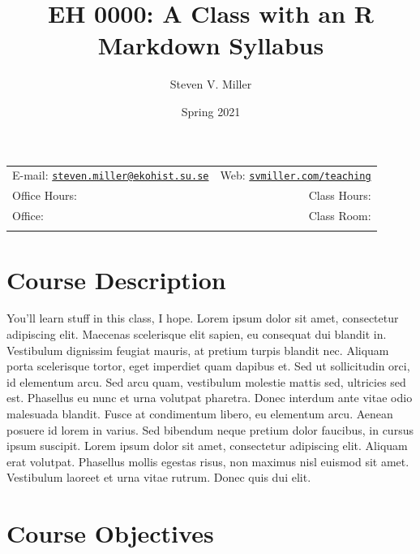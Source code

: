 \documentclass[11pt,]{article}
\title{EH 0000: A Class with an R Markdown Syllabus}
\author{Steven V. Miller}
\date{Spring 2021}
\newcommand{\shrug}[1][]{%
\begin{tikzpicture}[baseline,x=0.8\ht\strutbox,y=0.8\ht\strutbox,line width=0.125ex,#1]
\def\arm{(-2.5,0.95) to (-2,0.95) (-1.9,1) to (-1.5,0) (-1.35,0) to (-0.8,0)};
\draw \arm;
\draw[xscale=-1] \arm;
\def\headpart{(0.6,0) arc[start angle=-40, end angle=40,x radius=0.6,y radius=0.8]};
\draw \headpart;
\draw[xscale=-1] \headpart;
\def\eye{(-0.075,0.15) .. controls (0.02,0) .. (0.075,-0.15)};
\draw[shift={(-0.3,0.8)}] \eye;
\draw[shift={(0,0.85)}] \eye;
\draw (-0.1,0.2) to [out=15,in=-100] (0.4,0.95);
\end{tikzpicture}}
\begin{document}
		\maketitle
	

		\thispagestyle{firststyle}



	\noindent \begin{tabular*}{\textwidth}{ @{\extracolsep{\fill}} lr @{\extracolsep{\fill}}}


E-mail: \texttt{\href{mailto:steven.miller@ekohist.su.se}{\nolinkurl{steven.miller@ekohist.su.se}}} & Web: \href{http://svmiller.com/teaching}{\tt svmiller.com/teaching}\\
Office Hours: \shrug  &  Class Hours: \shrug\\
Office: \shrug  & Class Room: \shrug\\
	&  \\

	\hline
	\end{tabular*}

\vspace{2mm}


\section{Course Description}\label{course-description}

You'll learn stuff in this class, I hope. Lorem ipsum dolor sit amet,
consectetur adipiscing elit. Maecenas scelerisque elit sapien, eu
consequat dui blandit in. Vestibulum dignissim feugiat mauris, at
pretium turpis blandit nec. Aliquam porta scelerisque tortor, eget
imperdiet quam dapibus et. Sed ut sollicitudin orci, id elementum arcu.
Sed arcu quam, vestibulum molestie mattis sed, ultricies sed est.
Phasellus eu nunc et urna volutpat pharetra. Donec interdum ante vitae
odio malesuada blandit. Fusce at condimentum libero, eu elementum arcu.
Aenean posuere id lorem in varius. Sed bibendum neque pretium dolor
faucibus, in cursus ipsum suscipit. Lorem ipsum dolor sit amet,
consectetur adipiscing elit. Aliquam erat volutpat. Phasellus mollis
egestas risus, non maximus nisl euismod sit amet. Vestibulum laoreet et
urna vitae rutrum. Donec quis dui elit.

\section{Course Objectives}\label{course-objectives}
\end{document}
